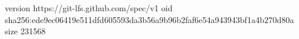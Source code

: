 version https://git-lfs.github.com/spec/v1
oid sha256:ede9ec06419e511dfd605593da3b56a9b96b2faf6e54a943943bf1a4b270d80a
size 231568
